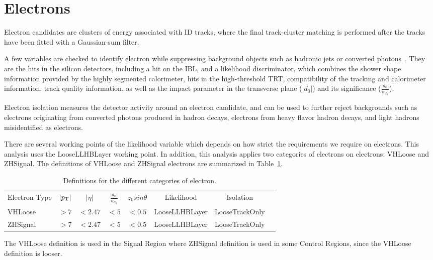 \section{Electrons}
\label{sec:el}
\par Electron candidates are clusters of energy associated with ID tracks, 
where the final track-cluster matching is performed after the tracks have been fitted with a Gaussian-sum filter.
\par A few variables are checked to identify electron while suppressing background objects 
such as hadronic jets or converted photons~\cite{ATL-PHYS-PUB-2015-041}. 
They are the hits in the silicon detectors, including a hit on the IBL, and a likelihood discriminator, 
which combines the shower shape information provided by the highly segmented calorimeter, hits in the high-threshold TRT, 
compatibility of the tracking and calorimeter information, track quality information, 
as well as the impact parameter in the transverse plane ($|d_0|$) and its significance ($\frac{|d_0|}{\sigma_{d_0}}$).
\par Electron isolation measures the detector activity around an electron candidate, 
and can be used to further reject backgrounds such as electrons originating from converted photons produced in hadron decays, 
electrons from heavy flavor hadron decays, and light hadrons misidentified as electrons.
\par There are several working points of the likelihood variable which depends on how strict the requirements we require on electrons. 
This analysis uses the LooseLLHBLayer working point. In addition, this analysis applies two categories of electrons on electrons:
VHLoose and ZHSignal. The definitions of VHLoose and ZHSignal electrons are summarized in Table~\ref{tab:el}.
\begin{table}[tbh]
\centering
\begin{tabular}{|l|c|c|c|c|c|c|c}
\hline
Electron Type & $|p_{\mathrm{T}}|$ & $|\eta|$ & $\frac{|d_0|}{\sigma_{d_0}}$ & $z_0\dot sin\theta$ & Likelihood & Isolation \\
VHLoose &$>7$&$<2.47$&$<5$&$<0.5$&LooseLLHBLayer&LooseTrackOnly\\
ZHSignal&$>7$&$<2.47$&$<5$&$<0.5$&LooseLLHBLayer&LooseTrackOnly\\
\hline

\end{tabular}
\caption{Definitions for the different categories of electron.}
\label{tab:el}
\end{table}
\par The VHLoose definition is used in the Signal Region where ZHSignal definition is used in some Control Regions, since the VHLoose definition is looser.
 

